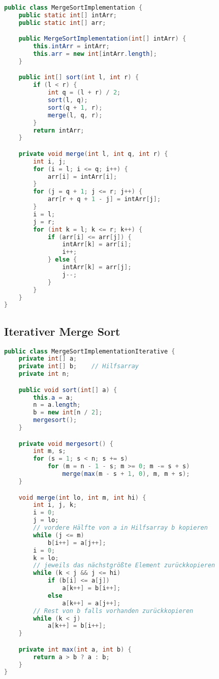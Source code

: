\begin{lstlisting}[language=java,caption={rekursiver Merge sort (Quelle: \cite{MergeSortRekursiv})},label=lst:MergeSortRekursiv]
public class MergeSortImplementation {
    public static int[] intArr;
    public static int[] arr;

    public MergeSortImplementation(int[] intArr) {
        this.intArr = intArr;
        this.arr = new int[intArr.length];
    }

    public int[] sort(int l, int r) {
        if (l < r) {
            int q = (l + r) / 2;
            sort(l, q);
            sort(q + 1, r);
            merge(l, q, r);
        }
        return intArr;
    }

    private void merge(int l, int q, int r) {
        int i, j;
        for (i = l; i <= q; i++) {
            arr[i] = intArr[i];
        }
        for (j = q + 1; j <= r; j++) {
            arr[r + q + 1 - j] = intArr[j];
        }
        i = l;
        j = r;
        for (int k = l; k <= r; k++) {
            if (arr[i] <= arr[j]) {
                intArr[k] = arr[i];
                i++;
            } else {
                intArr[k] = arr[j];
                j--;
            }
        }
    }
}
\end{lstlisting}

\subsection{Iterativer Merge Sort}

\begin{lstlisting}[language=java,caption={iterativer Merge sort (Quelle: \cite{MergeSortIterativ})},label=lst:MergeSortIterativ]
public class MergeSortImplementationIterative {
    private int[] a;
    private int[] b;    // Hilfsarray
    private int n;

    public void sort(int[] a) {
        this.a = a;
        n = a.length;
        b = new int[n / 2];
        mergesort();
    }

    private void mergesort() {
        int m, s;
        for (s = 1; s < n; s += s)
            for (m = n - 1 - s; m >= 0; m -= s + s)
                merge(max(m - s + 1, 0), m, m + s);
    }

    void merge(int lo, int m, int hi) {
        int i, j, k;
        i = 0;
        j = lo;
        // vordere Hälfte von a in Hilfsarray b kopieren
        while (j <= m)
            b[i++] = a[j++];
        i = 0;
        k = lo;
        // jeweils das nächstgrößte Element zurückkopieren
        while (k < j && j <= hi)
            if (b[i] <= a[j])
                a[k++] = b[i++];
            else
                a[k++] = a[j++];
        // Rest von b falls vorhanden zurückkopieren
        while (k < j)
            a[k++] = b[i++];
    }

    private int max(int a, int b) {
        return a > b ? a : b;
    }
}
\end{lstlisting}
